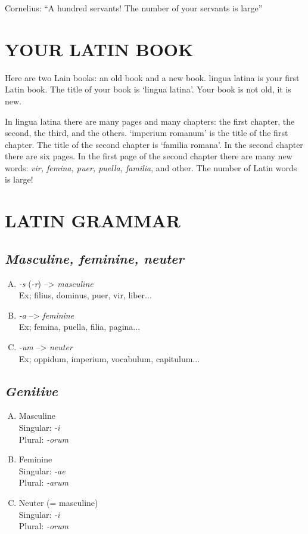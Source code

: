 Cornelius: ``A hundred servants! The number of your servants is large''


\section[Your Latin book]{YOUR LATIN BOOK}

Here are two Lain books: an old book and a new book. {\sc lingua latina} is your first Latin book. The title of your book is `{\sc lingua latina}'. Your book is not old, it is new.

In {\sc lingua latina} there are many pages and many chapters: the first chapter, the second, the third, and the others. `imperium romanum' is the title of the first chapter. The title of the second chapter is `familia romana'. In the second chapter there are six pages. In the first page of the second chapter there are many new words: \emph{vir, femina, puer, puella, familia}, and other. The number of Latin words is large!



\section[Grammar]{LATIN GRAMMAR}

\subsection{\emph{Masculine, feminine, neuter}}

\begin{enumerate}[(A)]
  \item \emph{-s} (\emph{-r}) --> \emph{masculine}\\
    Ex; filius, dominus, puer, vir, liber...
  \item \emph{-a} --> \emph{feminine}\\
    Ex; femina, puella, filia, pagina...
  \item \emph{-um} --> \emph{neuter}\\
    Ex; oppidum, imperium, vocabulum, capitulum...
\end{enumerate}

\subsection{\emph{Genitive}}
\begin{enumerate}[(A)]
  \item Masculine\\
    Singular: \emph{-i}\\
    Plural: \emph{-orum}
  \item Feminine\\
    Singular: \emph{-ae}\\
    Plural: \emph{-arum}
  \item Neuter (= masculine)\\
    Singular: \emph{-i}\\
    Plural: \emph{-orum}
\end{enumerate}

